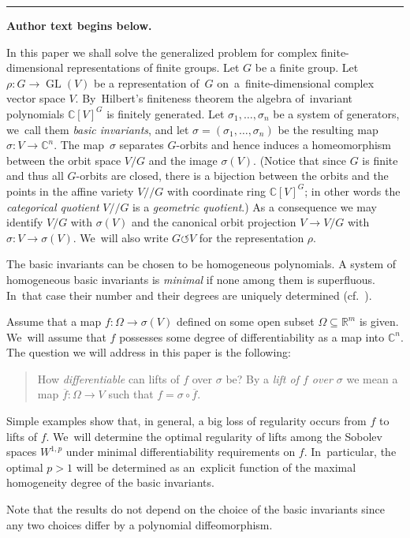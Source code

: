 \documentclass[11pt]{article}
\numberwithin{equation}{section}
\numberwithin{equation}{section}
\def\rh{\rho}
\def\si{\sigma}
\def\Om{\Omega}
\def\C{\mathbb{C}}
\def\R{\mathbb{R}}
\def\ol{\overline}
\renewcommand{\o}{\circ}
\def\cq{{/\!\!/}}
\def\acts{\circlearrowleft}
\let\on=\operatorname
\begin{document}
\medskip\hrule\medskip\noindent\textbf{Author text begins below.}\par
\setcounter{section}{1}
In this paper we shall solve the generalized problem for complex finite-dimensional representations of finite groups.
Let $G$ be a finite group.
Let $\rh\colon G \to \on{GL}(V)$ be a representation of~$G$ on~a~finite-dimensional complex vector space $V$. By~Hilbert's finiteness theorem the algebra of~inva\-riant polynomials $\C[V]^G$ is finitely generated.
Let $\si_1,\dots,\si_n$ be a system of generators, we~call them \emph{basic invariants}, and let
$\si= (\si_1,\dots,\si_n)$ be the resulting map $\si \colon V \to \C^n$.
The map~$\si$ separates $G$-orbits and hence induces a homeomorphism between the orbit space $V/G$ and the image $\si(V)$.
(Notice that since $G$ is finite and thus all $G$-orbits are closed, there is a bijection between the orbits and
the points in the affine variety $V \cq G$ with coordinate ring $\C[V]^G$; in other words the \emph{categorical quotient}
$V \cq G$ is a \emph{geometric quotient}.)
As a consequence we may identify $V/G$ with $\si(V)$ and the canonical orbit projection $V \to V/G$ with $\si \colon V \to \si(V)$. We~will also write $G \acts V$ for the representation $\rh$.


The basic invariants can be chosen to be homogeneous polynomials. A system of homogeneous basic invariants is \emph{minimal} if
none among them is superfluous. In~that case their number and their degrees are uniquely determined (cf.\ \cite[p.~95]{DK02}).

Assume that a map $f \colon \Om \to \si(V)$ defined on some open subset $\Om \subseteq \R^m$ is given. We~will assume that $f$ possesses some degree of differentiability as a map into $\C^n$.
The question we will address in this paper is the following:
\begin{quote}
 How \emph{differentiable} can lifts of $f$ over $\si$ be? By a \emph{lift of $f$ over $\si$} we mean a map
 $\ol f \colon \Om \to V$ such that $f = \si \o \ol f$.
\end{quote}
Simple examples show that, in general, a big loss of regularity occurs from $f$ to lifts of $f$. We~will determine the optimal regularity of lifts among the Sobolev spaces $W^{1,p}$ under minimal differentiability
requirements on $f$. In~particular, the optimal $p>1$ will be determined as an~explicit function of the maximal homogeneity degree
of the basic invariants.

Note that the results do not depend on the choice of the basic invariants since any two choices differ by a polynomial
diffeomorphism.
\end{document}
